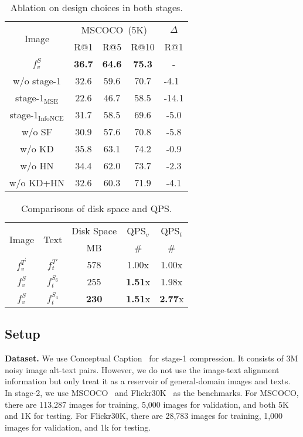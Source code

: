 \begin{table}[t!]
	\centering
	\begin{tabular}{c|ccc|c}
		\toprule
		\multirow{2}{*}{Image} &\multicolumn{3}{c|}{MSCOCO~(5K)} & $\Delta$\\
		&R@1 &R@5  &R@10  & R@1\\
		\cline{1-5}
		$f_v^{S}$  &\textbf{36.7} &\textbf{64.6} &\textbf{75.3} & -\\
		\cline{1-5}
		w/o stage-1 &32.6 &59.6 &70.7 &-4.1~ \\
		stage-1$_{\text{MSE}}$ &22.6  &46.7 &58.5 &-14.1 \\
		stage-1$_{\text{InfoNCE}}$ &31.7 &58.5 &69.6 &-5.0 \\
		\cline{1-5}
		w/o SF &30.9 &57.6 &70.8  &-5.8\\
		w/o KD &35.8 &63.1 &74.2 &-0.9\\
		w/o HN &34.4 &62.0 &73.7 &-2.3\\
		w/o KD+HN &32.6 &60.3 &71.9 &-4.1 \\
		\bottomrule
	\end{tabular}
	\caption{Ablation on design choices in both stages.}
	\label{table:main3}
\end{table}

\begin{table}[t!]
	\centering
	\begin{tabular}{cc|ccc}
		\toprule
		\multirow{2}{*}{Image}&\multirow{2}{*}{Text} & Disk Space &QPS$_v$ &QPS$_t$  \\
		&  &MB &\#  &\#  \\
		\cline{1-5}
		$f_v^{T^\prime}$ & $f_t^{T\prime}$ &578  &1.00x &1.00x \\
		\cline{1-5}
		$f_v^{S}$ & $f_t^{S_6}$ &255 &\textbf{1.51}x &1.98x \\
		$f_v^{S}$ & $f_t^{S_4}$ &\textbf{230} &\textbf{1.51}x &\textbf{2.77}x \\
		\bottomrule
	\end{tabular}
	\caption{Comparisons of disk space and QPS.}
	\label{table:main2}
\end{table}
\subsection{Setup}
\textbf{Dataset. }We use Conceptual Caption~\cite{cc} for stage-1 compression. 
It consists of 3M noisy image alt-text pairs. 
However, we do not use the image-text alignment information 
but only treat it as a reservoir of general-domain images and texts. In stage-2, we use MSCOCO~\cite{coco} and Flickr30K~\cite{flickr} as the benchmarks. For MSCOCO, there are 113,287 images for training, 5,000 images for validation, and both 5K and 1K for testing. For Flickr30K, there are 28,783 images for training, 1,000 images for validation, and 1k for testing.


